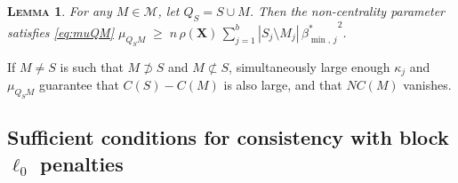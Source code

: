 \documentclass[bj,authoryear]{imsart}
\theoremstyle{plain}
\newtheorem{lem}[thm]{\textsc{Lemma}}
\newcommand{\M}{\mathcal{M}}
\newcommand{\bs}{\boldsymbol}
\begin{document}
\begin{lem}\label{lem:boundrho}
 For any $M\in\M$, let $Q_S=S \cup M$. Then the non-centrality parameter satisfies  \eqref{eq:muQM}
    $\mu_{Q_SM}\; \geq \;n\,\rho(\bs X)\,\sum_{j=1}^b|S_j\setminus M_j|\,{\beta_{\min,\,j}^*}^2$.
\end{lem}
If $M\neq S$ is such that $M\not\supset S$ and $M\not\subset S$, simultaneously large enough $\kappa_j$ and $\mu_{Q_S M}$ guarantee that $C(S)-C(M)$ is also large, and that $NC(M)$ vanishes.


\subsection{Sufficient conditions for consistency with block $\ell_0$ penalties}
\label{ssec:regression_mainresult}
\end{document}
